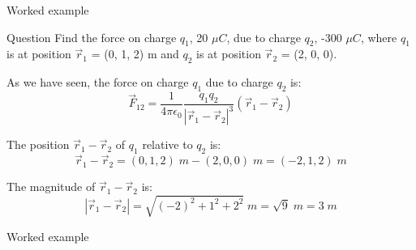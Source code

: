 {
\problemslide

%
%
%

\begin{frame}{Worked example}

\begin{blockexmplque}{Question}
Find the force on charge $q_1$, 20 ${\mu}C$, due to charge $q_2$, -300 ${\mu}C$,
where $q_1$ is at position $\vec{r}_{1}$ = (0, 1, 2) m and $q_2$ is at position $\vec{r}_{2}$ = (2, 0, 0).
\end{blockexmplque}
\vspace{0.4cm}

As we have seen, the force on charge $q_1$  due to charge $q_2$ is:
\begin{equation*}
  \displaystyle
   \vec{F}_{12} = \frac{1}{4\pi\epsilon_0} \frac{q_1 q_2}{|\vec{r}_{1}-\vec{r}_{2}|^{3}} (\vec{r}_{1}-\vec{r}_{2})
\end{equation*}

The position $\vec{r}_{1}-\vec{r}_{2}$  of $q_1$ relative to $q_2$ is:
\begin{equation*}
  \displaystyle
   \vec{r}_{1}-\vec{r}_{2} =  (0, 1, 2) \; m - (2, 0, 0) \; m = (-2, 1, 2) \; m
\end{equation*}

The magnitude of $\vec{r}_{1}-\vec{r}_{2}$ is:
\begin{equation*}
  \displaystyle
   |\vec{r}_{1}-\vec{r}_{2}| =  \sqrt{ (-2)^2 + 1^2 + 2^2} \; m = \sqrt{9} \; m = 3 \; m
\end{equation*}

\end{frame}

%
%
%

\begin{frame}{Worked example}


\end{frame}}
